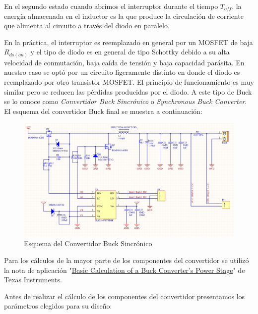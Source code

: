 \documentclass[12pt]{report}
\begin{document}
	En el segundo estado cuando abrimos el interruptor durante el tiempo $T_{off}$, la energía almacenada en el inductor es la que produce la circulación de corriente que alimenta al circuito a través del diodo en paralelo.
	
	En la práctica, el interruptor es reemplazado en general por un MOSFET de baja $R_{ds(on)}$ y el tipo de diodo es en general de tipo Schottky debido a su alta velocidad de conmutación, baja caída de tensión y baja capacidad parásita. En nuestro caso se optó por un circuito ligeramente distinto en donde el diodo es reemplazado por otro transistor MOSFET. El principio de funcionamiento es muy similar pero se reducen las pérdidas producidas por el diodo. A este tipo de Buck se lo conoce como \textit{Convertidor Buck Sincrónico} o \textit{Synchronous Buck Converter}. El esquema del convertidor Buck final se muestra a continuación:

	\newpage
	\begin{landscape}
		\newpage
		\begin{figure}[p]
			\centering
			\includegraphics[width=\paperwidth,height=\paperheight,keepaspectratio]{buck_schematic}
			\caption{Esquema del Convertidor Buck Sincrónico}
		\end{figure}
	\end{landscape}

	Para los cálculos de la mayor parte de los componentes del convertidor se utilizó la nota de aplicación "\href{http://www.ti.com/lit/an/slva477b/slva477b.pdf}{Basic Calculation of a Buck Converter's Power Stage}" de Texas Instruments.
	
	Antes de realizar el cálculo de los componentes del convertidor presentamos los parámetros elegidos para su diseño:
	
\end{document}
